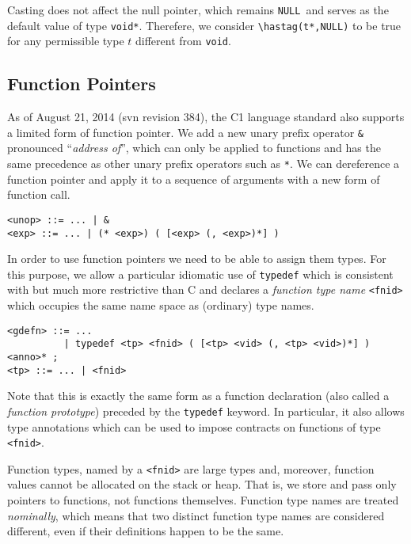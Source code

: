 \documentclass[11pt]{article}
\newcommand{\vnull}{\texttt{NULL}}
\newcommand{\tvoid}{\texttt{void}}
\begin{document}
Casting does not affect the null pointer, which remains \vnull\ and
serves as the default value of type \lstinline'void*'.  Therefere, we
consider \lstinline'\hastag(t*,NULL)' to be true for any permissible type
$t$ different from \tvoid.

\subsection{Function Pointers}

As of August 21, 2014 (svn revision 384), the C1 language standard
also supports a limited form of function pointer.  We add a new unary
prefix operator \lstinline'&' pronounced ``\emph{address of}'', which can
only be applied to functions and has the same precedence as other
unary prefix operators such as \lstinline'*'.  We can dereference a
function pointer and apply it to a sequence of arguments with a new
form of function call.
\begin{lstlisting}[basicstyle=\smallbasicstyle]
<unop> ::= ... | &
<exp> ::= ... | (* <exp>) ( [<exp> (, <exp>)*] )
\end{lstlisting}

In order to use function pointers we need to be able to assign them
types.  For this purpose, we allow a particular idiomatic use of
\lstinline'typedef' which is consistent with but much more restrictive than
C and declares a \emph{function type name} \lstinline'<fnid>' which occupies
the same name space as (ordinary) type names.

\begin{lstlisting}[basicstyle=\smallbasicstyle]
<gdefn> ::= ...
          | typedef <tp> <fnid> ( [<tp> <vid> (, <tp> <vid>)*] ) <anno>* ;
<tp> ::= ... | <fnid>
\end{lstlisting}

Note that this is exactly the same form as a function declaration
(also called a \emph{function prototype}) preceded by the
\lstinline'typedef' keyword.  In particular, it also allows type
annotations which can be used to impose contracts on functions of type
\lstinline'<fnid>'.

Function types, named by a \lstinline'<fnid>' are large types and, moreover,
function values cannot be allocated on the stack or heap.  That is, we
store and pass only pointers to functions, not functions themselves.
Function type names are treated \emph{nominally}, which means that two
distinct function type names are considered different, even if their
definitions happen to be the same.
\end{document}
